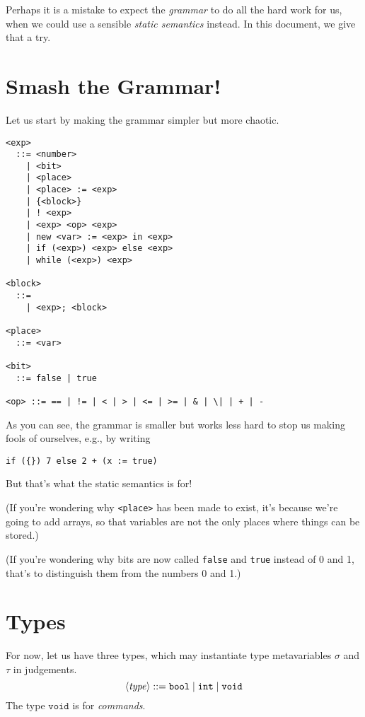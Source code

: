 \documentclass{article}
\begin{document}
Perhaps it is a mistake to expect the \emph{grammar} to do all the hard work for us, when we could use a sensible \emph{static semantics} instead. In this document, we give that a try.


\section{Smash the Grammar!}

Let us start by making the grammar simpler but more chaotic.

\begin{verbatim}
<exp>
  ::= <number>
    | <bit>
    | <place>
    | <place> := <exp>
    | {<block>}
    | ! <exp>
    | <exp> <op> <exp>
    | new <var> := <exp> in <exp>
    | if (<exp>) <exp> else <exp>
    | while (<exp>) <exp>

<block>
  ::=
    | <exp>; <block>

<place>
  ::= <var>

<bit>
  ::= false | true

<op> ::= == | != | < | > | <= | >= | & | \| | + | -
\end{verbatim}

As you can see, the grammar is smaller but works less hard to stop us making fools of ourselves, e.g., by writing

\begin{verbatim}
if ({}) 7 else 2 + (x := true)
\end{verbatim}

But that's what the static semantics is for!

(If you're wondering why {\tt <place>} has been made to exist, it's because we're going to add arrays, so that variables are not the only places where things can be stored.)

(If you're wondering why bits are now called {\tt false} and {\tt true} instead
of 0 and 1, that's to distinguish them from the numbers 0 and 1.)


\section{Types}

\newcommand{\bool}{\mathtt{bool}}
\newcommand{\intg}{\mathtt{int}}
\newcommand{\void}{\mathtt{void}}
\newcommand{\es}{\mathit{es}}
\newcommand{\false}{\mathtt{false}}
\newcommand{\true}{\mathtt{true}}
\newcommand{\JPl}[3]{#1 \vdash #2 \leftarrow #3} 
\newcommand{\JBl}[4]{#1 \vdash #2 | #3 : #4} 
\newcommand{\JEx}[3]{#1 \vdash #2 : #3} 
For now, let us have three types, which may instantiate type
metavariables $\sigma$ and $\tau$ in judgements.
\[
  \NT{type} ::= \bool \;|\; \intg \;|\; \void
\]
The type $\void$ is for \emph{commands}.
\end{document}
